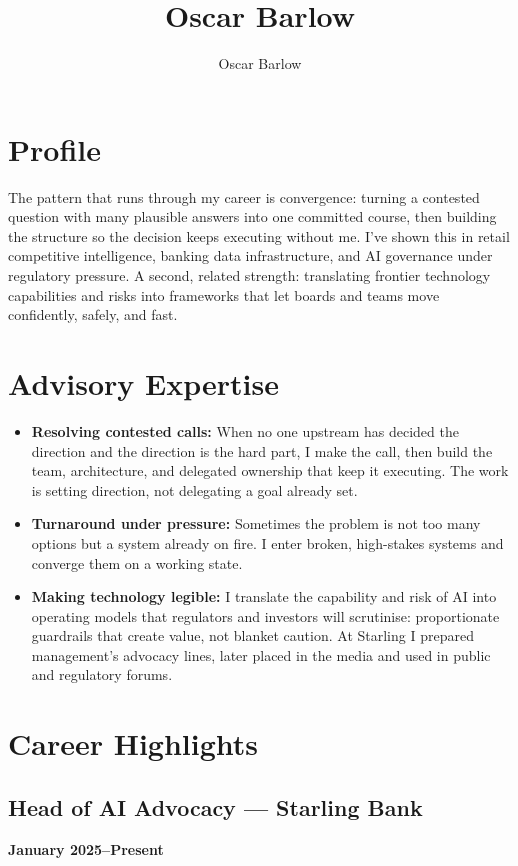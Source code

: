 \documentclass[a4paper]{scrartcl}
\author{Oscar Barlow}
\title{Oscar Barlow}
\date{}
\begin{document}
\maketitle

\section*{Profile}
{ %
  \setlength{\parskip}{6pt plus 2pt minus 1pt}
  The pattern that runs through my career is convergence: turning a contested question with many
  plausible answers into one committed course, then building the structure so the decision keeps
  executing without me. I've shown this in retail competitive intelligence, banking data infrastructure,
  and AI governance under regulatory pressure. A second, related strength: translating frontier technology
  capabilities and risks into frameworks that let boards and teams move confidently, safely, and fast.
} %

\section*{Advisory Expertise}
\begin{itemize}
  \item \textbf{Resolving contested calls:} When no one upstream has decided the direction and the
    direction is the hard part, I make the call, then build the team, architecture, and delegated
    ownership that keep it executing. The work is setting direction, not delegating a goal already set.
  \item \textbf{Turnaround under pressure:} Sometimes the problem is not too many options but a system
    already on fire. I enter broken, high-stakes systems and converge them on a working state.
  \item \textbf{Making technology legible:} I translate the capability and risk of AI into operating
    models that regulators and investors will scrutinise: proportionate guardrails that create value,
    not blanket caution. At Starling I prepared management's advocacy lines, later placed in the media
    and used in public and regulatory forums.
\end{itemize}

\section*{Career Highlights}

\subsection*{Head of AI Advocacy --- Starling Bank}
\textbf{January 2025--Present}
\end{document}
